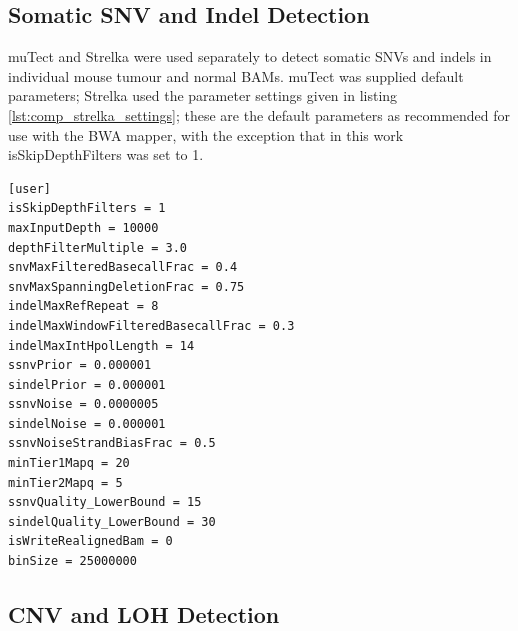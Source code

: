 \documentclass[thesis.tex]{subfiles}
\begin{document}
\subsection{Somatic SNV and Indel Detection}

muTect and Strelka were used separately to detect somatic \glspl{SNV} and \glspl{indel} in individual mouse tumour and normal \glspl{BAM}.  muTect was supplied default parameters; Strelka used the parameter settings given in listing \ref{lst:comp_strelka_settings}; these are the default parameters as recommended for use with the BWA mapper, with the exception that in this work isSkipDepthFilters was set to 1.

\begin{lstlisting}[caption=Strelka configuration file used for SNV / indel detection,label=lst:comp_strelka_settings]
[user]
isSkipDepthFilters = 1
maxInputDepth = 10000
depthFilterMultiple = 3.0
snvMaxFilteredBasecallFrac = 0.4
snvMaxSpanningDeletionFrac = 0.75
indelMaxRefRepeat = 8
indelMaxWindowFilteredBasecallFrac = 0.3
indelMaxIntHpolLength = 14
ssnvPrior = 0.000001
sindelPrior = 0.000001
ssnvNoise = 0.0000005
sindelNoise = 0.000001
ssnvNoiseStrandBiasFrac = 0.5
minTier1Mapq = 20
minTier2Mapq = 5
ssnvQuality_LowerBound = 15
sindelQuality_LowerBound = 30
isWriteRealignedBam = 0
binSize = 25000000
\end{lstlisting}


\subsection{CNV and LOH Detection}
\end{document}
